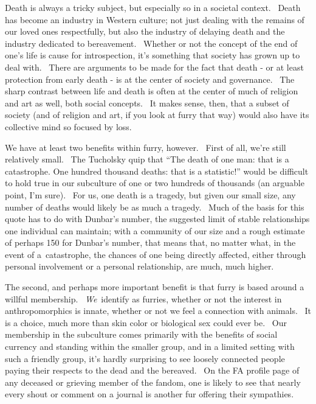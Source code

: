 Death is always a tricky subject, but especially so in a societal
context. ~Death has become an industry in Western culture; not just
dealing with the remains of our loved ones respectfully, but also the
industry of delaying death and the industry dedicated to bereavement.
~Whether or not the concept of the end of one's life is cause for
introspection, it's something that society has grown up to deal with.
~There are arguments to be made for the fact that death - or at least
protection from early death - is at the center of society and
governance. ~The sharp contrast between life and death is often at the
center of much of religion and art as well, both social concepts. ~It
makes sense, then, that a subset of society (and of religion and art, if
you look at furry that way) would also have its collective mind so
focused by loss.

We have at least two benefits within furry, however. ~First of all,
we're still relatively small. ~The Tucholsky quip that ``The death of
one man: that is a catastrophe. One hundred thousand deaths: that is a
statistic!'' would be difficult to hold true in our subculture of one or
two hundreds of thousands (an arguable point, I'm sure). ~For us, one
death is a tragedy, but given our small size, any number of deaths would
likely be as much a tragedy. ~Much of the basis for this quote has to do
with Dunbar's number, the suggested limit of stable relationships one
individual can maintain; with a community of our size and a rough
estimate of perhaps 150 for Dunbar's number, that means that, no matter
what, in the event of a~catastrophe, the chances of one being directly
affected, either through personal involvement or a personal
relationship, are much, much higher.

The second, and perhaps more important benefit is that furry is based
around a willful membership. ~\emph{We}~identify as furries, whether or
not the interest in anthropomorphics is innate, whether or not we feel a
connection with animals. ~It is a choice, much more than skin color or
biological sex could ever be. ~Our membership in the subculture comes
primarily with the benefits of social currency and standing within the
smaller group, and in a limited setting with such a friendly group, it's
hardly surprising to see loosely connected people paying their respects
to the dead and the bereaved. ~On the FA profile page of any deceased or
grieving member of the fandom, one is likely to see that nearly every
shout or comment on a journal is another fur offering their sympathies.

